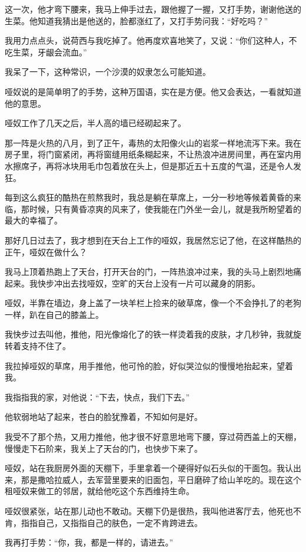 \par 这一次，他才弯下腰来，我马上伸手过去，跟他握了一握，又打手势，谢谢他送的生菜。他知道我猜出是他送的，脸都涨红了，又打手势问我：“好吃吗？”
\par 我用力点点头，说荷西与我吃掉了。他再度欢喜地笑了，又说：“你们这种人，不吃生菜，牙龈会流血。”
\par 我呆了一下，这种常识，一个沙漠的奴隶怎么可能知道。
\par 哑奴说的是简单明了的手势，这种万国语，实在是方便。他又会表达，一看就知道他的意思。
\par 哑奴工作了几天之后，半人高的墙已经砌起来了。
\par 那一阵是火热的八月，到了正午，毒热的太阳像火山的岩浆一样地流泻下来。我在房子里，将门窗紧闭，再将窗缝用纸条糊起来，不让热浪冲进房间里，再在室内用水擦席子，再将冰块用毛巾包着放在头上，但是那近五十五度的气温，还是令人发狂。
\par 每到这么疯狂的酷热在煎熬我时，我总是躺在草席上，一分一秒地等候着黄昏的来临，那时候，只有黄昏凉爽的风来了，使我能在门外坐一会儿，就是我所盼望着的最大的幸福了。
\par 那好几日过去了，我才想到在天台上工作的哑奴，我居然忘记了他，在这样酷热的正午，哑奴在做什么？
\par 我马上顶着热跑上了天台，打开天台的门，一阵热浪冲过来，我的头马上剧烈地痛起来。我快步冲出去找哑奴，空旷的天台上没有一片可以藏身的阴影。
\par 哑奴，半靠在墙边，身上盖了一块羊栏上捡来的破草席，像一个不会挣扎了的老狗一样，趴在自己的膝盖上。
\par 我快步过去叫他，推他，阳光像熔化了的铁一样烫着我的皮肤，才几秒钟，我就旋转着支持不住了。
\par 我拉掉哑奴的草席，用手推他，他可怜的脸，好似哭泣似的慢慢地抬起来，望着我。
\par 我指指我的家，对他说：“下去，快点，我们下去。”
\par 他软弱地站了起来，苍白的脸犹豫着，不知如何是好。
\par 我受不了那个热，又用力推他，他才很不好意思地弯下腰，穿过荷西盖上的天棚，慢慢走下石阶来，我关上了天台的门，也快步下来了。
\par 哑奴，站在我厨房外面的天棚下，手里拿着一个硬得好似石头似的干面包。我认出来，那是撒哈拉威人，去军营里要来的旧面包，平日磨碎了给山羊吃的。现在这个租哑奴来做工的邻居，就给他吃这个东西维持生命。
\par 哑奴很紧张，站在那儿动也不敢动。天棚下仍是很热，我叫他进客厅去，他死也不肯，指指自己，又指指自己的肤色，一定不肯跨进去。
\par 我再打手势：“你，我，都是一样的，请进去。”

